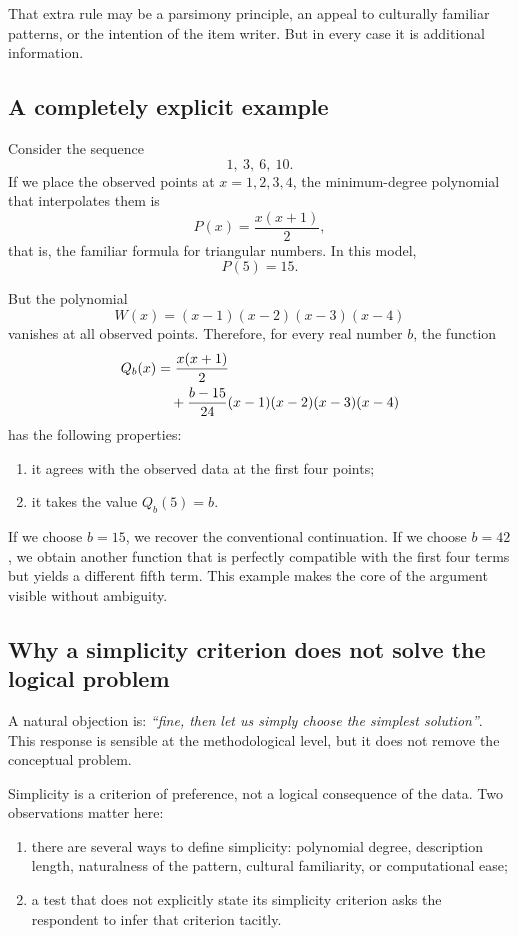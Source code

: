 \documentclass[10pt, a4paper]{article}
\theoremstyle{plain}
\theoremstyle{definition}
\theoremstyle{remark}
\begin{document}
That extra rule may be a parsimony principle, an appeal to culturally familiar
patterns, or the intention of the item writer. But in every case it is
additional information.

\subsection{A completely explicit example}

Consider the sequence
\[
1,\ 3,\ 6,\ 10.
\]
If we place the observed points at $x=1,2,3,4$, the minimum-degree polynomial
that interpolates them is
\[
P(x)=\frac{x(x+1)}{2},
\]
that is, the familiar formula for triangular numbers. In this model,
\[
P(5)=15.
\]

But the polynomial
\[
W(x)=(x-1)(x-2)(x-3)(x-4)
\]
vanishes at all observed points. Therefore, for every real number $b$, the
function
\begin{align}
Q_b(x) &= \frac{x(x+1)}{2} \notag\\
&\quad + \frac{b-15}{24}(x-1)(x-2)(x-3)(x-4)
\label{eq:example}
\end{align}
has the following properties:
\begin{enumerate}[label=\arabic*.]
    \item it agrees with the observed data at the first four points;
    \item it takes the value $Q_b(5)=b$.
\end{enumerate}

If we choose $b=15$, we recover the conventional continuation. If we choose
$b=42$, we obtain another function that is perfectly compatible with the first
four terms but yields a different fifth term. This example makes the core of the
argument visible without ambiguity.

\subsection{Why a simplicity criterion does not solve the logical problem}

A natural objection is: \emph{``fine, then let us simply choose the simplest
solution''}. This response is sensible at the methodological level, but it does
not remove the conceptual problem.

Simplicity is a criterion of preference, not a logical consequence of the data.
Two observations matter here:
\begin{enumerate}[label=\arabic*.]
    \item there are several ways to define simplicity: polynomial degree,
          description length, naturalness of the pattern, cultural familiarity,
          or computational ease;
    \item a test that does not explicitly state its simplicity criterion asks the
          respondent to infer that criterion tacitly.
\end{enumerate}
\end{document}
